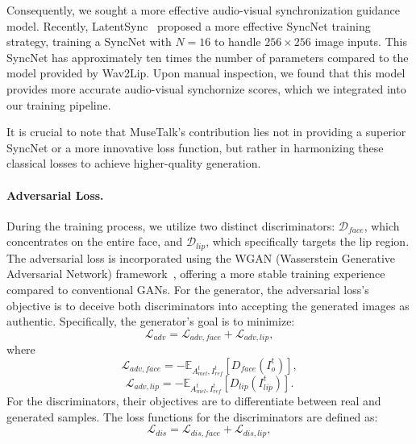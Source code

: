 \documentclass[10pt,twocolumn,letterpaper]{article}
\begin{document}
Consequently, we sought a more effective audio-visual synchronization guidance model.
Recently, LatentSync~\cite{li2024latentsync} proposed a more effective SyncNet training strategy, training a SyncNet with $N = 16$ to handle $256\times256$ image inputs.
This SyncNet has approximately ten times the number of parameters compared to the model provided by Wav2Lip. Upon manual inspection, we found that this model provides more accurate audio-visual synchornize scores, which we integrated into our training pipeline.

It is crucial to note that MuseTalk's contribution lies not in providing a superior SyncNet or a more innovative loss function, but rather in harmonizing these classical losses to achieve higher-quality generation.



\paragraph{Adversarial Loss.}
During the training process, we utilize two distinct discriminators: \(\mathcal D_{face}\), which concentrates on the entire face, and \(\mathcal D_{lip}\), which specifically targets the lip region.  
The adversarial loss is incorporated using the WGAN (Wasserstein Generative Adversarial Network) framework~\cite{arjovsky2017wasserstein}, offering a more stable training experience compared to conventional GANs.
For the generator, the adversarial loss's objective is to deceive both discriminators into accepting the generated images as authentic. Specifically, the generator's goal is to minimize:
\begin{equation}
\mathcal{L}_{adv} = \mathcal{L}_{adv,face}+\mathcal{L}_{adv,lip},
\end{equation}
where 
\begin{equation}
\mathcal{L}_{adv,face} = -\mathbb{E}_{A_{mel}^{t},I^{t}_{ref}} [D_{face}(I^{t}_{o})],
\end{equation}
\begin{equation}
\mathcal{L}_{adv,lip} = -\mathbb{E}_{A_{mel}^{t},I^{t}_{ref}} [D_{lip}(I^{t}_{lip})].
\end{equation}
For the discriminators, their objectives are to differentiate between real and generated samples. 
The loss functions for the discriminators are defined as:
\begin{equation}
\mathcal{L}_{dis} = \mathcal{L}_{dis,face}+\mathcal{L}_{dis,lip},
\end{equation}
\end{document}
